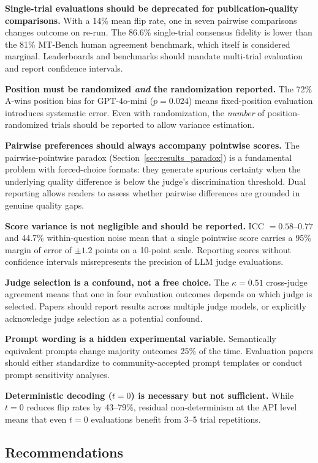 \documentclass{ijclclp}
\begin{document}
\textbf{Single-trial evaluations should be deprecated for publication-quality comparisons.} With a 14\% mean flip rate, one in seven pairwise comparisons changes outcome on re-run. The 86.6\% single-trial consensus fidelity is lower than the 81\% MT-Bench human agreement benchmark, which itself is considered marginal. Leaderboards and benchmarks should mandate multi-trial evaluation and report confidence intervals.

\textbf{Position must be randomized \textit{and} the randomization reported.} The 72\% A-wins position bias for GPT-4o-mini ($p = 0.024$) means fixed-position evaluation introduces systematic error. Even with randomization, the \textit{number} of position-randomized trials should be reported to allow variance estimation.

\textbf{Pairwise preferences should always accompany pointwise scores.} The pairwise-pointwise paradox (Section~\ref{sec:results_paradox}) is a fundamental problem with forced-choice formats: they generate spurious certainty when the underlying quality difference is below the judge's discrimination threshold. Dual reporting allows readers to assess whether pairwise differences are grounded in genuine quality gaps.

\textbf{Score variance is not negligible and should be reported.} ICC $= 0.58$--$0.77$ and 44.7\% within-question noise mean that a single pointwise score carries a 95\% margin of error of $\pm 1.2$ points on a 10-point scale. Reporting scores without confidence intervals misrepresents the precision of LLM judge evaluations.

\textbf{Judge selection is a confound, not a free choice.} The $\kappa = 0.51$ cross-judge agreement means that one in four evaluation outcomes depends on which judge is selected. Papers should report results across multiple judge models, or explicitly acknowledge judge selection as a potential confound.

\textbf{Prompt wording is a hidden experimental variable.} Semantically equivalent prompts change majority outcomes 25\% of the time. Evaluation papers should either standardize to community-accepted prompt templates or conduct prompt sensitivity analyses.

\textbf{Deterministic decoding ($t=0$) is necessary but not sufficient.} While $t=0$ reduces flip rates by 43--79\%, residual non-determinism at the API level means that even $t=0$ evaluations benefit from 3--5 trial repetitions.

\subsection{Recommendations}
\label{sec:recommendations}
\end{document}
